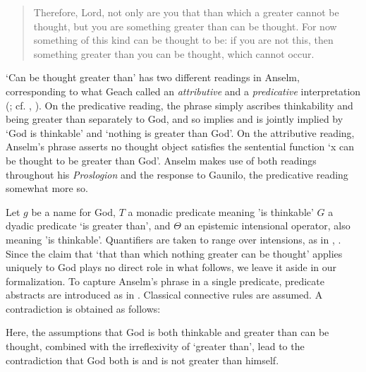 \documentclass[]{birkjour}
\begin{document}
\begin{quote}
Therefore, Lord, not only are you that than which a greater cannot be thought, but you are something greater than can be thought. For now something of this kind can be thought to be: if you are not this, then something greater than you can be thought, which cannot occur.
\end{quote}

`Can be thought greater than' has two different readings in Anselm, corresponding to what Geach called an \textit{attributive} and a \textit{predicative} interpretation (\cite{Geach1956}; cf. \cite{Thomson1997}, \cite{Almotahari2015}). On the predicative reading, the phrase simply ascribes thinkability and being greater than separately to God, and so implies and is jointly implied by `God is thinkable' and `nothing is greater than God'. On the attributive reading, Anselm's phrase asserts no thought object satisfies the sentential function `x can be thought to be greater than God'. Anselm makes use of both readings throughout his \textit{Proslogion} and the response to Gaunilo, the predicative reading somewhat more so. 

Let $g$ be a name for God, $T$ a monadic predicate meaning 'is thinkable'  $G$ a dyadic predicate `is greater than', and $\Theta$ an epistemic intensional operator, also meaning 'is thinkable'. Quantifiers are taken to range over intensions, as in \cite{CIFOL2}, \cite{CIFOL1}. Since the claim that `that than which nothing greater can be thought' applies uniquely to God plays no direct role in what follows, we leave it aside in our formalization. To capture Anselm's phrase in a single predicate, predicate abstracts are introduced as in \cite{Fitting1998}. Classical connective rules are assumed. A contradiction is obtained as follows:

\bigskip


\bigskip

Here, the assumptions that God is both thinkable and greater than can be thought, combined with the irreflexivity of `greater than', lead to the contradiction that God both is and is not greater than himself.
\end{document}
